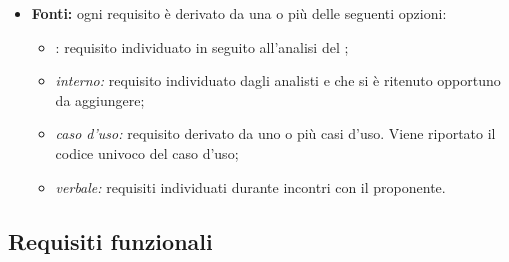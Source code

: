 \begin{itemize}
	\item \textbf{Fonti:} ogni requisito è derivato da una o più delle seguenti opzioni:
		\begin{itemize}
			\item {}: requisito individuato in seguito all'analisi del ;
			\item \textit{interno:} requisito individuato dagli analisti e che si è ritenuto opportuno da aggiungere;
			\item \textit{caso d'uso:} requisito derivato da uno o più casi d'uso. Viene riportato il codice univoco del caso d'uso;
			\item \textit{verbale:} requisiti individuati durante incontri con il proponente.			
		\end{itemize}	
\end{itemize}

\vspace{0.5cm}

\subsection{Requisiti funzionali}

